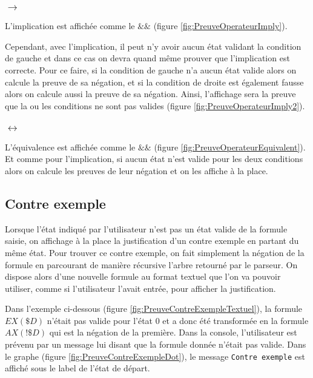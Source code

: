 \documentclass[dvipsnames]{report}
\begin{document}


\subsubsection{$\rightarrow$}

L'implication est affichée comme le $\&\&$ (figure \ref{fig:PreuveOperateurImply}).



Cependant, avec l'implication, il peut n'y avoir aucun état validant la condition de gauche et dans ce cas on devra quand même prouver que l'implication est correcte. Pour ce faire, si la condition de gauche n'a aucun état valide alors on calcule la preuve de sa négation, et si la condition de droite est également fausse alors on calcule aussi la preuve de sa négation. Ainsi, l'affichage sera la preuve que la ou les conditions ne sont pas valides (figure \ref{fig:PreuveOperateurImply2}).



\subsubsection{$\leftrightarrow$}

L'équivalence est affichée comme le $\&\&$ (figure \ref{fig:PreuveOperateurEquivalent}). Et comme pour l'implication, si aucun état n'est valide pour les deux conditions alors on calcule les preuves de leur négation et on les affiche à la place.



\subsection{Contre exemple}

Lorsque l'état indiqué par l'utilisateur n'est pas un état valide de la formule saisie, on affichage à la place la justification d'un contre exemple en partant du même état. Pour trouver ce contre exemple, on fait simplement la négation de la formule en parcourant de manière récursive l'arbre retourné par le parseur. On dispose alors d'une nouvelle formule au format textuel que l'on va pouvoir utiliser, comme si l'utilisateur l'avait entrée, pour afficher la justification.

Dans l'exemple ci-dessous (figure \ref{fig:PreuveContreExempleTextuel}), la formule $EX(\$D)$ n'était pas valide pour l'état 0 et a donc été transformée en la formule $AX(!\$D)$ qui est la négation de la première. Dans la console, l'utilisateur est prévenu par un message lui disant que la formule donnée n'était pas valide. Dans le graphe (figure \ref{fig:PreuveContreExempleDot}), le message \texttt{Contre exemple} est affiché sous le label de l'état de départ.
\end{document}
